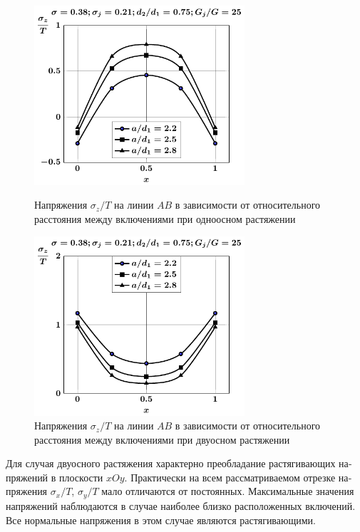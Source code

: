 \begin{russian}
\begin{figure}[h!]
\centering\footnotesize
\parbox[b]{7.5cm}{\centering\includegraphics[width=7.8cm]{inc4-a-d75-g25-t1-sig_z.pdf}
\caption{Напряжения $\sigma_z/T$ на линии $AB$ в зависимости от относительного расстояния между включениями при одноосном растяжении
\label{f:9:64}}}\hfil\hfil
\parbox[b]{7.5cm}{\centering\includegraphics[width=7.8cm]{inc4-a-d75-g25-t2-sig_z.pdf}
\caption{Напряжения $\sigma_z/T$ на линии $AB$ в зависимости от относительного расстояния между включениями при двуосном растяжении
\label{f:9:65}}}
\end{figure}

Для случая двуосного растяжения характерно преобладание растягивающих напряжений в плоскости $xOy$. Практически на всем рассматриваемом отрезке напряжения $\sigma_x/T$, $\sigma_y/T$ мало отличаются от постоянных. Максимальные значения напряжений наблюдаются в случае наиболее близко расположенных включений. Все нормальные напряжения в этом случае являются растягивающими.


\end{russian}
